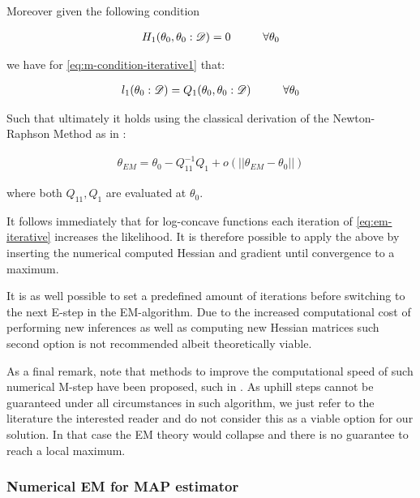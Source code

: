 \documentclass[11pt]{article}
\begin{document}
\begin{article}
Moreover given the following condition

\begin{align} 
 H_1(\theta_0, \theta_0 : \mathscr{D})  = 0 \hspace*{1cm} \forall \theta_0 \label{eq:m-condition-entropy-iterative}
\end{align}

we have for \ref{eq:m-condition-iterative1} that:

\begin{align} 
 l_1(\theta_0: \mathscr{D})  = Q_1(\theta_0, \theta_0: \mathscr{D}) \hspace*{1cm} \forall \theta_0 \label{eq:m-condition-entropy-iterative2} 
\end{align}

Such that ultimately it holds using the classical derivation of the
Newton-Raphson Method as in \cite{storvik2007numerical}:


\begin{align} 
 \theta_{EM}  = \theta_{0} - Q_{11}^{-1} Q_1 + o(||\theta_{EM} - \theta_{0}||) \label{eq:em-iterative}
\end{align}

where both \(Q_{11}, Q_{1}\) are evaluated at \(\theta_0\).

It follows immediately that for log-concave functions each iteration
of \ref{eq:em-iterative} increases the likelihood. It is therefore
possible to apply the above by inserting the numerical computed
Hessian and gradient until convergence to a maximum.

It is as well possible to set a predefined amount of iterations
before switching to the next E-step in the EM-algorithm. Due to the
increased computational cost of performing new inferences as well as
computing new Hessian matrices such second option is not
recommended albeit theoretically viable.

As a final remark, note that methods to improve the computational
speed of such numerical M-step have been proposed, such in
\cite{Louis_1982}. As uphill steps cannot be guaranteed under all
circumstances in such algorithm, we just refer to the literature
the interested reader and do not consider this as a viable option
for our solution. In that case the EM theory would collapse and
there is no guarantee to reach a local maximum.

\subsubsection{Numerical EM for MAP estimator}
\label{sec:org61a5728}


\end{article}
\end{document}
